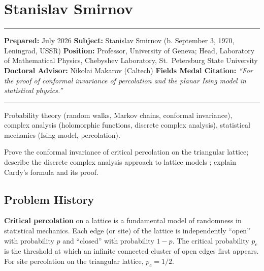\chapter{Stanislav Smirnov}\label{ch2010stanislavsmirnov:stanislav-smirnov-fields-medal-2010-a-comprehensive-report-on-his-work-and-impact}

\begin{center}\rule{0.5\linewidth}{0.5pt}\end{center}

\textbf{Prepared:} July 2026 \textbf{Subject:} Stanislav Smirnov (b. September 3, 1970, Leningrad, USSR) \textbf{Position:} Professor, University of Geneva; Head, Laboratory of Mathematical Physics, Chebyshev Laboratory, St.~Petersburg State University \textbf{Doctoral Advisor:} Nikolai Makarov (Caltech) \textbf{Fields Medal Citation:} \emph{``For the proof of conformal invariance of percolation and the planar Ising model in statistical physics.''}

\begin{center}\rule{0.5\linewidth}{0.5pt}\end{center}

\begin{prereqs} Probability theory (random walks, Markov chains, conformal invariance), complex analysis (holomorphic functions, discrete complex analysis), statistical mechanics (Ising model, percolation). \end{prereqs}

\begin{objectives} Prove the conformal invariance of critical percolation on the triangular lattice; describe the discrete complex analysis approach to lattice models \cite{smirnov2010}; explain Cardy's formula and its proof. \end{objectives}

\section{Problem History}\label{ch2010stanislavsmirnov:problem-history}

\textbf{Critical percolation} on a lattice is a fundamental model of randomness in statistical mechanics. Each edge (or site) of the lattice is independently ``open'' with probability $p$ and ``closed'' with probability $1-p$. The critical probability $p_c$ is the threshold at which an infinite connected cluster of open edges first appears. For site percolation on the triangular lattice, $p_c = 1/2$.

